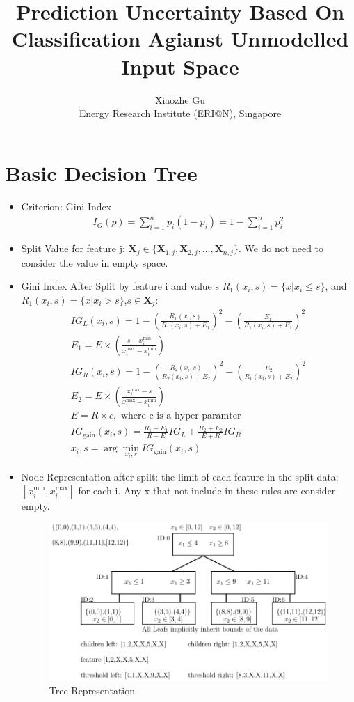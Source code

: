 \documentclass[11pt,onecolumn]{IEEEtran}
\begin{document}
     
\title{Prediction Uncertainty Based On Classification Agianst Unmodelled Input Space}
\author{Xiaozhe Gu\\Energy Research Institute (ERI@N), Singapore }

\maketitle

\section{Basic Decision Tree}
\begin{itemize}
  \item Criterion: Gini Index
\begin{align*}
I_G(p)=\sum_{i=1}^np_i(1-p_i)=1-\sum_{i=1}^n p_i^2
\end{align*}
\item Split Value for feature j: $\mathbf X_j\in  \{\mathbf X_{1,j},\mathbf X_{2,j},\ldots,\mathbf X_{n,j}\}$. We do not need to consider the value in empty space.
\item Gini Index After Split by feature i and value s $R_1(x_i,s)=\{x|x_i\leq s\}$, and $R_1(x_i,s)=\{x|x_i>s\}$,$s \in \mathbf X_j$:
\begin{align*}
IG_L(x_i,s)=1-\left(\frac{R_1(x_i,s)}{R_1(x_i,s)+E_1}\right)^2-\left(\frac{E_1}{R_1(x_i,s)+E_1}\right)^2\\
E_1=E\times \left(\frac{s-x_i^{\mbox{min}}}{x_i^{\mbox{max}}-x_i^{\mbox{min}}}\right)\\
IG_R(x_i,s)=1-\left(\frac{R_2(x_i,s)}{R_2(x_i,s)+E_2}\right)^2-\left(\frac{E_2}{R_1(x_i,s)+E_2}\right)^2\\
E_2=E\times \left(\frac{x_i^{\mbox{max}}-s}{x_i^{\mbox{max}}-x_i^{\mbox{min}}}\right)\\
E=R\times c,\mbox{ where c is a hyper paramter}\\ 
IG_{\mbox{gain}}(x_i,s)=\frac{R_1+E_1}{R+E}IG_L+\frac{R_2+E_2}{E+R}IG_R\\
x_i,s=\arg \min_{x_i,s} IG_{\mbox{gain}}(x_i,s)
\end{align*}
\item Node Representation after spilt: the limit of each feature in the split data:  $[x_i^{\mbox{min}},x_i^{\mbox{max}}]$ for each i.  Any x that not include in these rules are consider empty. 
  \begin{figure}[h]
    \centering
    \caption{Tree Representation}
    \includegraphics[scale=1]{image/tree.pdf} 

\end{figure}
\end{itemize}
\end{document}
